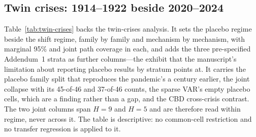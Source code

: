 
\subsection{Twin crises: 1914--1922 beside 2020--2024}

Table~\ref{tab:twin-crises} backs the twin-crises analysis. It sets the placebo
regime beside the shift regime, family by family and mechanism by mechanism,
with marginal 95\% and joint path coverage in each, and adds the three
pre-specified Addendum~1 strata as further columns---the exhibit that the
manuscript's limitation about reporting placebo results by stratum points at.
It carries the placebo family split that reproduces the pandemic's a century
earlier, the joint collapse with its 45-of-46 and 37-of-46 counts, the sparse
VAR's empty placebo cells, which are a finding rather than a gap, and the CBD
cross-crisis contrast. The two joint columns span $H=9$ and $H=5$ and are
therefore read within regime, never across it. The table is descriptive: no
common-cell restriction and no transfer regression is applied to it.

\begin{table}[htbp]\centering
\caption{Placebo (train to 1913, test 1914--1922, eleven populations) and shift
(train to 2019, test 2020--2024, twenty populations) side by side: marginal
95\% and joint path coverage by family and mechanism, with the placebo strata
of Addendum~1 as further columns. Joint coverage spans $H=9$ placebo and $H=5$
shift horizons---not one scale. The sparse VAR's empty placebo cells are a
finding rather than a gap.}
\label{tab:twin-crises}
\end{table}
